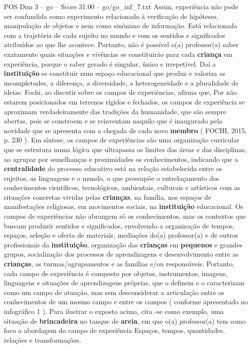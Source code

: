 \begin{textsample}{POS Dim 3 – go – Score 31.00 – go/go\_inf\_7.txt}
Assim, experiência não pode ser confundida como experimento relacionado à verificação de hipóteses, manipulação de objetos e nem como sinônimo de informação.
Está relacionada com a trajetória de cada sujeito no mundo e com os sentidos e significados atribuídos ao que lhe acontece.
Portanto, não é possível o(a) professor(a) saber exatamente quais situações e vivências se constituirão para cada \textbf{criança} em experiência, porque o saber gerado é singular, único e irrepetível.
Daí a \textbf{instituição} se constituir num espaço educacional que produz e valoriza as incompletudes, a diferença, a diversidade, a heterogeneidade e a pluralidade de ideias.
Fochi, ao discutir sobre os campos de experiências, afirma que, Por não estarem posicionados em terrenos rígidos e fechados, os campos de experiência se aproximam verdadeiramente das tradições da humanidade, que são sempre abertas, pois se constroem e se reinventam naquilo que é inaugurado pela novidade que se apresenta com a chegada de cada novo \textbf{membro} ( FOCHI, 2015, p. 230 ).
Em síntese, os campos de experiências são uma organização curricular que se estrutura numa lógica que ultrapassa os limites das áreas e das disciplinas, ao agrupar por semelhanças e proximidades os conhecimentos, indicando que a \textbf{centralidade} do processo educativo está na relação estabelecida entre os sujeitos, as linguagens e o mundo, o que pressupõe o entrelaçamento dos conhecimentos científicos, tecnológicos, ambientais, culturais e artísticos com as situações concretas vividas pelas \textbf{crianças}, na família, nos espaços de manifestações religiosas, em movimentos sociais, na \textbf{instituição} educacional.
Os campos de experiências não abrangem só os conhecimentos, mas os contextos que buscam produzir sentidos e significados, envolvendo a organização de tempos, espaços, seleção e oferta de materiais, mediações do(a) professor(a) e de outros profissionais da \textbf{instituição}, organização das \textbf{crianças} em \textbf{pequenos} e grandes grupos, socialização dos processos de aprendizagens e desenvolvimento entre as \textbf{crianças}, as turmas/agrupamentos e as famílias e/ou responsáveis.
Portanto, cada campo de experiência é composto por objetos, instrumentos, imagens, linguagens e situações de aprendizagens próprias, que o definem e o caracterizam como um campo de atuação, mas sem desconsiderar a articulação entre os conhecimentos de um mesmo campo e entre os campos ( conforme apresentado no infográfico 1 ).
Para ilustrar o exposto acima, cita -se como exemplo, uma situação de \textbf{brincadeira} no tanque de \textbf{areia}, em que o(a) professor(a) tem como foco a abordagem do campo de experiência Espaços, tempos, quantidades, relações e transformações.

\end{textsample}
